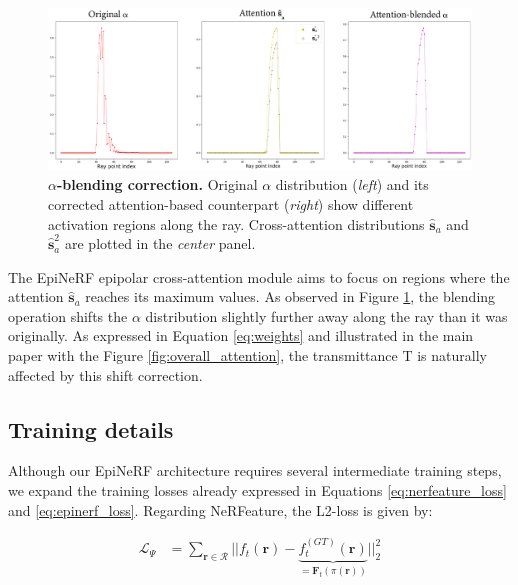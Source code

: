 \begin{figure}[h!]
    \begin{center}
  \includegraphics[width=\linewidth]{images/epinerf/SUPP_BLENDED_OVERLEAF.png}
  \caption{$\alpha$\textbf{-blending correction.} Original $\alpha$ distribution (\textit{left}) and its corrected attention-based counterpart (\textit{right}) show different activation regions along the ray. Cross-attention distributions $\hat{\textbf{s}}_{a}$ and $\hat{\textbf{s}}_{a}^{2}$ are plotted in the \textit{center} panel.}
  \label{fig:attention_construction}
  \end{center}
\end{figure}

The EpiNeRF epipolar cross-attention module aims to focus on regions where the attention $\hat{\textbf{s}}_{a}$ reaches its maximum values. As observed in Figure \ref{fig:attention_construction}, the blending operation shifts the $\alpha$ distribution slightly further away along the ray than it was originally. As expressed in Equation \ref{eq:weights} and illustrated in the main paper with the Figure \ref{fig:overall_attention}, the transmittance T is naturally affected by this shift correction. 

\subsection{Training details}
\label{appendix:epinerf-training}
Although our EpiNeRF architecture requires several intermediate training steps, we expand the training losses already expressed in Equations \ref{eq:nerfeature_loss} and \ref{eq:epinerf_loss}. Regarding NeRFeature, the L2-loss is given by: 

\begin{equation}
\begin{split}
 \mathcal{L}_{\Psi}&= \sum_{\mathbf{r}\in\mathcal{R}} || f_{t}(\mathbf{r}) - \underbrace{f_{t}^{(GT)}(\mathbf{r})}_{=\mathbf{F}_{t}(\pi(\mathbf{r}))} ||_{2}^{2} 
\end{split}
\end{equation}


